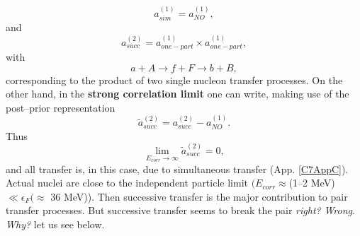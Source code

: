 \begin{equation}
a_{sim}^{(1)}=a_{NO}^{(1)},
\end{equation}
and
\begin{equation}
a_{succ}^{(2)}=a_{one-part}^{(1)}\times a_{one-part}^{(1)},
\end{equation}
\vspace{0.2cm}
with
\begin{equation}
a+A\rightarrow f+F \rightarrow b+B,
\end{equation}         
corresponding to the product of two single nucleon transfer processes.
On the other hand, in the \textbf{strong correlation limit} one can write, making use of the
post--prior representation
\begin{equation}
\tilde a_{succ}^{(2)}= a_{succ}^{(2)}-a_{NO}^{(1)}.
\end{equation}
Thus
\begin{equation}
\lim_{E_{corr}\rightarrow \infty} \tilde a_{succ}^{(2)}=0,
\end{equation}
and all transfer is, in this case, due to simultaneous transfer (App. \ref{C7AppC}).
Actual nuclei are close to the independent particle limit $(E_{corr}\approx$(1--2 MeV) $\ll \epsilon_F(\approx$ 36 MeV)). Then successive transfer is the major contribution to pair transfer processes. But successive transfer seems to break the pair \textit{right?} \textit{Wrong}. \textit{Why?} let us see below.
